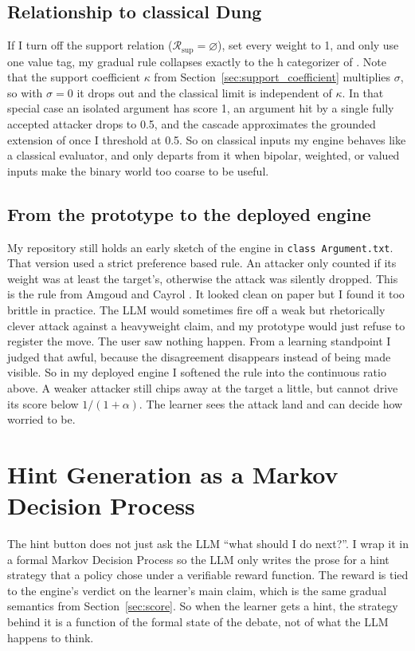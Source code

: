 \subsection{Relationship to classical Dung}
\label{sec:relationship_dung}
If I turn off the support relation ($\mathcal{R}_{\text{sup}} = \varnothing$), set every weight to 1, and only use one value tag, my gradual rule collapses exactly to the h categorizer of \cite{besnard2001logic}. Note that the support coefficient $\kappa$ from Section~\ref{sec:support_coefficient} multiplies $\sigma$, so with $\sigma = 0$ it drops out and the classical limit is independent of $\kappa$. In that special case an isolated argument has score 1, an argument hit by a single fully accepted attacker drops to 0.5, and the cascade approximates the grounded extension of \cite{dung1995acceptability} once I threshold at 0.5. So on classical inputs my engine behaves like a classical evaluator, and only departs from it when bipolar, weighted, or valued inputs make the binary world too coarse to be useful.

\subsection{From the prototype to the deployed engine}
\label{sec:prototype}
My repository still holds an early sketch of the engine in \texttt{class~Argument.txt}. That version used a strict preference based rule. An attacker only counted if its weight was at least the target's, otherwise the attack was silently dropped. This is the rule from Amgoud and Cayrol \cite{amgoud2002reasoning}. It looked clean on paper but I found it too brittle in practice. The LLM would sometimes fire off a weak but rhetorically clever attack against a heavyweight claim, and my prototype would just refuse to register the move. The user saw nothing happen. From a learning standpoint I judged that awful, because the disagreement disappears instead of being made visible. So in my deployed engine I softened the rule into the continuous ratio above. A weaker attacker still chips away at the target a little, but cannot drive its score below $1/(1+\alpha)$. The learner sees the attack land and can decide how worried to be.

\section{Hint Generation as a Markov Decision Process}
\label{sec:mdp}
The hint button does not just ask the LLM ``what should I do next?''. I wrap it in a formal Markov Decision Process so the LLM only writes the prose for a hint strategy that a policy chose under a verifiable reward function. The reward is tied to the engine's verdict on the learner's main claim, which is the same gradual semantics from Section~\ref{sec:score}. So when the learner gets a hint, the strategy behind it is a function of the formal state of the debate, not of what the LLM happens to think.

